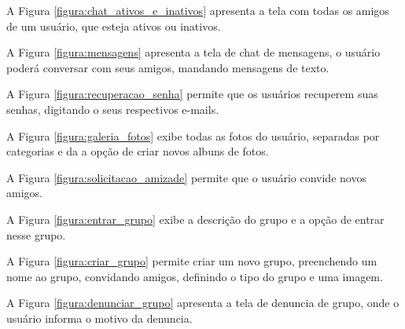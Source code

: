 
A Figura \ref{figura:chat_ativos_e_inativos} apresenta a tela com todas os amigos de um usuário, que esteja ativos ou inativos.


A Figura \ref{figura:mensagens} apresenta a tela de chat de mensagens, o usuário poderá conversar com seus amigos, mandando mensagens de texto.


A Figura \ref{figura:recuperacao_senha} permite que os usuários recuperem suas senhas, digitando o seus respectivos e-mails.


A Figura \ref{figura:galeria_fotos} exibe todas as fotos do usuário, separadas por categorias  e da a opção de criar novos albuns de fotos.


A Figura \ref{figura:solicitacao_amizade} permite que o usuário convide novos amigos.


A Figura \ref{figura:entrar_grupo} exibe a descrição do grupo e a opção de entrar nesse grupo.


A Figura \ref{figura:criar_grupo} permite criar um novo grupo, preenchendo um nome ao grupo, convidando amigos, definindo o tipo do grupo e uma imagem.


A Figura \ref{figura:denunciar_grupo} apresenta a tela de denuncia de grupo, onde o usuário informa o motivo da denuncia.


